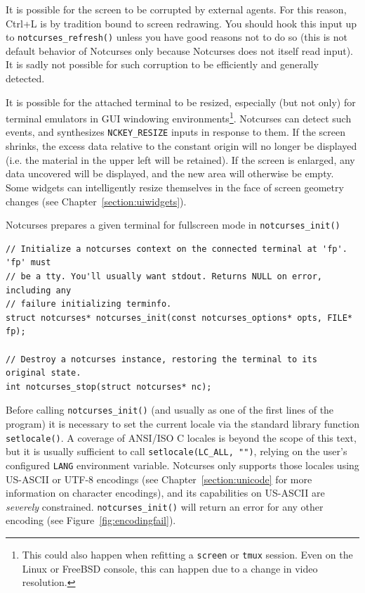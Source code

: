 \documentclass[letterpaper,10pt]{article}
\begin{document}
It is possible for the screen to be corrupted by external agents. For this
reason, Ctrl+L is by tradition bound to screen redrawing. You should hook this
input up to \texttt{notcurses\_refresh()} unless you have good reasons not to
do so (this is not default behavior of Notcurses only because Notcurses does
not itself read input). It is sadly not possible for such corruption to be
efficiently and generally detected.

It is possible for the attached terminal to be resized, especially (but not
only) for terminal emulators in GUI windowing environments\footnote{This could
also happen when refitting a \texttt{screen} or \texttt{tmux} session.
Even on the Linux or FreeBSD console, this can happen due to a change in video
resolution.}. Notcurses can detect such events, and synthesizes
\texttt{NCKEY\_RESIZE} inputs in response to them. If the screen shrinks, the
excess data relative to the constant origin will no longer be displayed (i.e.
the material in the upper left will be retained). If the screen is enlarged,
any data uncovered will be displayed, and the new area will otherwise be empty.
Some widgets can intelligently resize themselves in the face of screen
geometry changes (see Chapter~\ref{section:uiwidgets}).

Notcurses prepares a given terminal for fullscreen mode in \texttt{notcurses\_init()}

\begin{listing}[!htbp]
\begin{verbatim}
// Initialize a notcurses context on the connected terminal at 'fp'. 'fp' must
// be a tty. You'll usually want stdout. Returns NULL on error, including any
// failure initializing terminfo.
struct notcurses* notcurses_init(const notcurses_options* opts, FILE* fp);

// Destroy a notcurses instance, restoring the terminal to its original state.
int notcurses_stop(struct notcurses* nc);
\end{verbatim}
\end{listing}

Before calling \texttt{notcurses\_init()} (and usually as one of the first lines
of the program) it is necessary to set the current locale via the standard
library function \texttt{setlocale()}. A coverage of ANSI/ISO C locales is beyond
the scope of this text, but it is usually sufficient to call
\texttt{setlocale(LC\_ALL, "")}, relying on the user's configured \texttt{LANG}
environment variable. Notcurses only supports those locales using
US-ASCII or UTF-8 encodings (see Chapter~\ref{section:unicode} for more
information on character encodings), and its capabilities on US-ASCII
are \textit{severely} constrained. \texttt{notcurses\_init()} will return an
error for any other encoding (see Figure~\ref{fig:encodingfail}).
\end{document}
